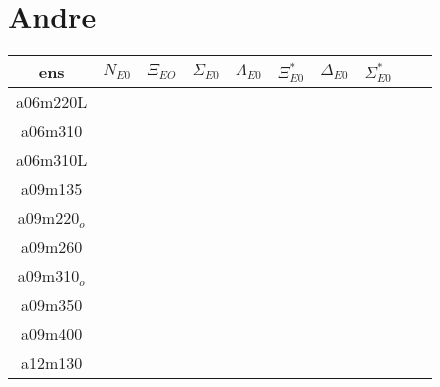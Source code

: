 \documentclass{article}
\begin{document}
\section*{Andre}
\begin{table}[h!]
  \centering
 \setlength{\arrayrulewidth}{0.5mm}
\setlength{\tabcolsep}{13pt}
\renewcommand{\arraystretch}{2}
 \begin{tabular}{|| c |c | c | c | c | c | c | c | c | c | ||} 
 \hline
 ens & $N_{E0}$ & $\Xi_{EO}$ & $\Sigma_{E0}$ & $\Lambda_{E0}$ &  $\Xi^*_{E0}$ & $\Delta_{E0}$ & $\Sigma^*_{E0}$\\ [0.8ex] 
 \hline\hline
 a06m220L 
 & {}   &   {} & {}   & {}   & {}  & {} & {} \\ 
 \hline
 a06m310 
 & {}   &   {} & {}   & {}   & {}  & {} & {} \\ 
 \hline
 a06m310L 
  & {}   &   {} & {}   & {}   & {}  & {} & {} \\ 
 \hline
 a09m135 
  & {}   &   {} & {}   & {}   & {}  & {} & {} \\ 
 \hline
 a09m220$_o$ 
 & {}   &   {} & {}   & {}   & {}  & {} & {} \\ 
 \hline
 a09m260
  & {}   &   {} & {}   & {}   & {}  & {} & {} \\ 
 \hline
 a09m310$_o$
  & {}   &   {} & {}   & {}   & {}  & {} & {} \\ 
 \hline
 a09m350 
  & {}   &   {} & {}   & {}   & {}  & {} & {} \\ 
 \hline
 a09m400 
  & {}   &   {} & {}   & {}   & {}  & {} & {} \\ 
 \hline
 a12m130 
  & {}   &   {} & {}   & {}   & {}  & {} & {} \\ 
 \hline
 
 \end{tabular}
\end{table}
 \newpage
\end{document}
